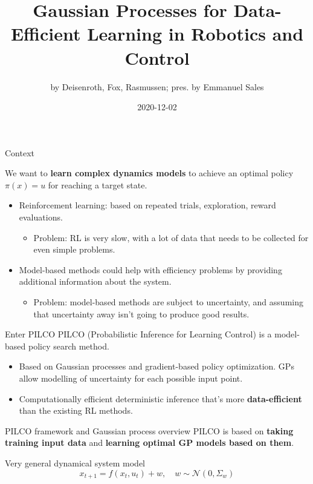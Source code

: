 \documentclass{beamer}
\title{Gaussian Processes for Data-Efficient Learning in Robotics and Control}
\subtitle{by Deisenroth, Fox, Rasmussen; pres. by Emmanuel Sales}
\date{2020-12-02}
\begin{document}
\begin{frame}
	\maketitle
\end{frame}	
\begin{frame}{Context}
	
	We want to \textbf{learn complex dynamics models} to achieve an optimal policy $\pi(x) = u$ for reaching a target state.
	
	\begin{itemize}
		\item Reinforcement learning: based on repeated trials, exploration, reward evaluations.
		\begin{itemize}
			\item Problem: RL is very slow, with a lot of data that needs to be collected for even simple problems.
		\end{itemize}
		\item Model-based methods could help with efficiency problems by providing additional information about the system.
		\begin{itemize}
			\item Problem: model-based methods are subject to uncertainty, and assuming that uncertainty away isn't going to produce good results.
		\end{itemize}	
	\end{itemize}
\end{frame}
\begin{frame}{Enter PILCO}
	PILCO (Probabilistic Inference for Learning Control) is a model-based policy search method.
	\begin{itemize}
		\item Based on Gaussian processes and gradient-based policy optimization. GPs allow modelling of uncertainty for each possible input point.
		\item Computationally efficient deterministic inference that's more \textbf{data-efficient} than the existing RL methods.
	\end{itemize}
\end{frame}
\begin{frame}{PILCO framework and Gaussian process overview}
	PILCO is based on \textbf{taking training input data} and \textbf{learning optimal GP models based on them}.
	
	Very general dynamical system model $$ x_{t+1} = f(x_t, u_t) + w, \quad w \sim \mathcal{N}(0, \Sigma_w) $$
	
	
\end{frame}
\end{document}
